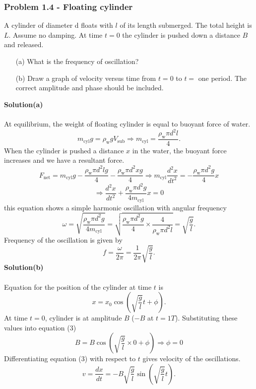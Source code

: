 \documentclass[12pt,a4paper]{article}
\begin{document}
\subsubsection*{Problem 1.4 - Floating cylinder}
A cylinder of diameter d floats with $l$ of its length submerged. The total height is $L$. Assume no damping. At time $t=0$ the cylinder is pushed down a distance $B$ and released.
\begin{enumerate}
    \item[(a)]What is the frequency of oscillation?
    \item[(b)]Draw a graph of velocity versus time from $t=0$ to $t=$ one period. The correct amplitude and phase should be included.
\end{enumerate}
\textbf{Solution(a)}
\\
\\At equilibrium, the weight of floating cylinder is equal to buoyant force of water.
\[m_{\text{cyl}}g=\rho_{\text{w}}gV_{\text{sub}}\Rightarrow m_{\text{cyl}}=\frac{\rho_{\text{w}}\pi d^2l}{4}.\]
When the cylinder is pushed a distance $x$ in the water, the buoyant force increases and we have a resultant force.
\[F_{\text{net}}=m_{\text{cyl}}g-\frac{\rho_{\text{w}}\pi d^2lg}{4}-\frac{\rho_{\text{w}}\pi d^2xg}{4}\Rightarrow m_{\text{cyl}}\frac{d^2x}{dt^2}=-\frac{\rho_{\text{w}}\pi d^2g}{4}x\]
\begin{equation}
    \Rightarrow \frac{d^2x}{dt^2}+\frac{\rho_{\text{w}}\pi d^2g}{4m_{\text{cyl}}}x=0
\end{equation}
this equation shows a simple harmonic oscillation with angular frequency 
\[\omega=\sqrt{\frac{\rho_{\text{w}}\pi d^2g}{4m_{\text{cyl}}}}=\sqrt{\frac{\rho_{\text{w}}\pi d^2g}{4}\times\frac{4}{\rho_{\text{w}}\pi d^2l}}=\sqrt{\frac{g}{l}}.\]
Frequency of the oscillation is given by
\[f=\frac{\omega}{2\pi}=\frac{1}{2\pi}\sqrt{\frac{g}{l}}.\]
\textbf{Solution(b)}
\\
\\Equation for the position of the cylinder at time $t$ is
\begin{equation}
    x=x_0\cos\left(\sqrt{\frac{g}{l}}t+\phi\right).
\end{equation}
At time $t=0$, cylinder is at amplitude $B$ ($-B$ at $t=1T$). 
Substituting these values into equation (3)
\[B=B\cos\left(\sqrt{\frac{g}{l}}\times0+\phi\right)\Rightarrow\phi=0\]
Differentiating equation (3) with respect to $t$ gives velocity of the oscillations.
\[v=\frac{dx}{dt}=-B\sqrt{\frac{g}{l}}\sin\left(\sqrt{\frac{g}{l}}t\right).\]
\end{document}
